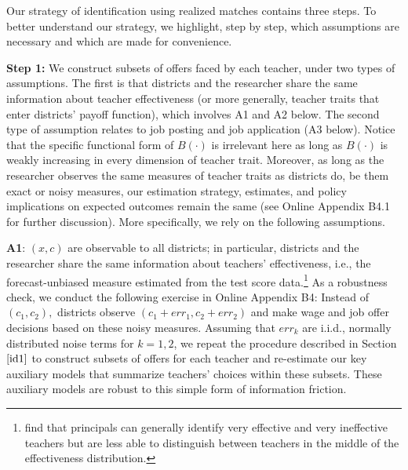 \documentclass[notitlepage,12pt]{article}%
\begin{document}
Our strategy of identification using realized matches contains three
steps. To better understand our strategy, we highlight, step by step, which assumptions are necessary and which are made for convenience.


\noindent \textbf{Step 1:} We construct subsets of offers faced by each teacher, under two types of assumptions. The first is that districts and the researcher share the same
information about teacher effectiveness (or more generally, teacher traits
that enter districts' payoff function), which involves A1 and A2 below. The second type of assumption relates to job posting and job application (A3 below). Notice that the specific functional form of $B\left(
\cdot\right)  $ is irrelevant here as long as $B\left(  \cdot\right)  $ is
weakly increasing in every dimension of teacher trait. Moreover, as long as
the researcher observes the same measures of teacher traits as districts do, be them exact or noisy measures, our estimation strategy, estimates, and policy implications on expected outcomes remain the same (see Online Appendix B4.1 for further discussion). %
More specifically, we rely on the following assumptions. 


\noindent \textbf{A1}: $\left(  x,c\right)  $ are observable to
all districts; in particular, districts and the researcher share the same information about teachers' effectiveness, i.e., the forecast-unbiased measure estimated from the test score data.\footnote{\citet{jacob2008can} find that principals can
generally identify very effective and very ineffective teachers but are less
able to distinguish between teachers in the middle of the effectiveness
distribution.} As a robustness check, we conduct the following exercise in Online
Appendix B4: Instead of $\left(  c_{1},c_{2}\right)  ,$ districts observe
$\left(  c_{1}+err_{1},c_{2}+err_{2}\right)  $ and make wage and job offer
decisions based on these noisy measures. Assuming that $err_{k}$ are i.i.d.,
normally distributed noise terms for $k=1,2$, we repeat the procedure
described in Section $\ref{id1}$ to construct subsets of offers for each
teacher and re-estimate our key auxiliary models that summarize teachers'
choices within these subsets. These auxiliary models are robust to this simple
form of information friction.
\end{document}
